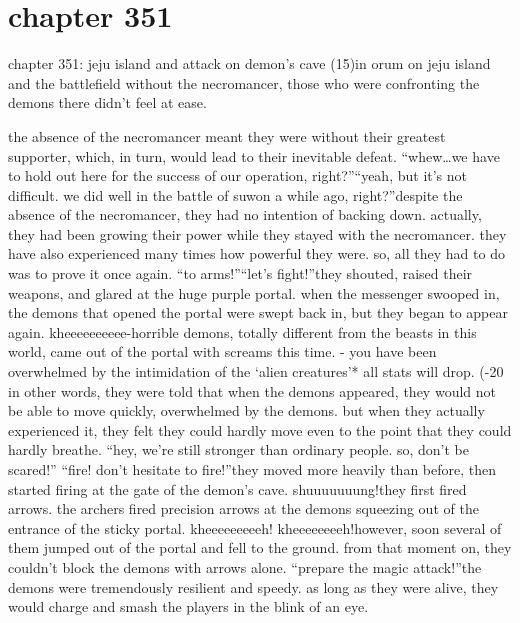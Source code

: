 \section{chapter 351}

chapter 351: jeju island and attack on demon’s cave (15)in orum on jeju island and the battlefield without the necromancer, those who were confronting the demons there didn’t feel at ease.





the absence of the necromancer meant they were without their greatest supporter, which, in turn, would lead to their inevitable defeat.
“whew…we have to hold out here for the success of our operation, right?”“yeah, but it’s not difficult.
 we did well in the battle of suwon a while ago, right?”despite the absence of the necromancer, they had no intention of backing down.
actually, they had been growing their power while they stayed with the necromancer.
they have also experienced many times how powerful they were.
 so, all they had to do was to prove it once again.
“to arms!”“let’s fight!”they shouted, raised their weapons, and glared at the huge purple portal.
when the messenger swooped in, the demons that opened the portal were swept back in, but they began to appear again.
kheeeeeeeeee-horrible demons, totally different from the beasts in this world, came out of the portal with screams this time.
- you have been overwhelmed by the intimidation of the ‘alien creatures’* all stats will drop.
 (-20%
 in other words, they were told that when the demons appeared, they would not be able to move quickly, overwhelmed by the demons.
 but when they actually experienced it, they felt they could hardly move even to the point that they could hardly breathe.
“hey, we’re still stronger than ordinary people.
 so, don’t be scared!”
“fire! don’t hesitate to fire!”they moved more heavily than before, then started firing at the gate of the demon’s cave.
shuuuuuuung!they first fired arrows.
 the archers fired precision arrows at the demons squeezing out of the entrance of the sticky portal.
kheeeeeeeeeh! kheeeeeeeeh!however, soon several of them jumped out of the portal and fell to the ground.
 from that moment on, they couldn’t block the demons with arrows alone.
“prepare the magic attack!”the demons were tremendously resilient and speedy.
 as long as they were alive, they would charge and smash the players in the blink of an eye.

